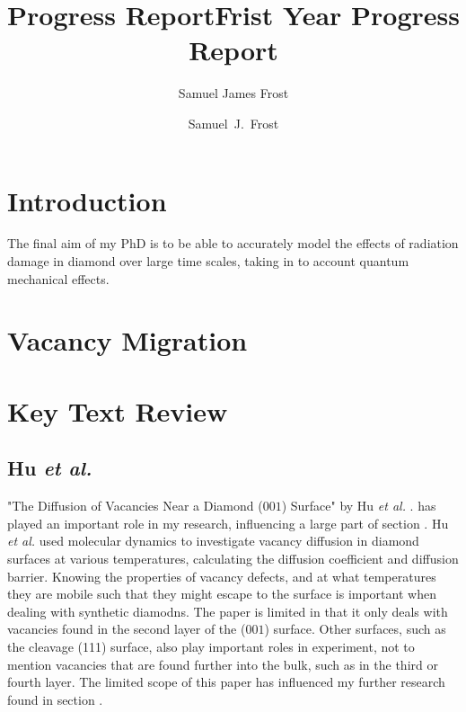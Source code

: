 \documentclass[10pt,a4paper,twocolumn,twoside]{extarticle}
\title{Progress Report}
\author{Samuel James Frost}
\title{Frist Year Progress Report}
\author{Samuel~J.~Frost}
\newcommand{\al}{\emph{et al. }}
\begin{document}
	\thispagestyle{empty}
	\tableofcontents

	
\section{Introduction}
The final aim of my PhD is to be able to accurately model the effects of radiation damage in diamond over large time scales, taking in to account quantum mechanical effects.

\section{Vacancy Migration}



\section{Key Text Review}
\subsection{Hu \al}
\label{Hu}
"The Diffusion of Vacancies Near a Diamond ($001$) Surface" by Hu \al. has played an important role in my research, influencing a large part of section . Hu \al used molecular dynamics to investigate vacancy diffusion in diamond surfaces at various temperatures, calculating the diffusion coefficient and diffusion barrier. Knowing the properties of vacancy defects, and at what temperatures they are mobile such that they might escape to the surface is important when dealing with synthetic diamodns. The paper is limited in that it only deals with vacancies found in the second layer of the ($001$) surface. Other surfaces, such as the cleavage (111) surface, also play important roles in experiment, not to mention vacancies that are found further into the bulk, such as in the third or fourth layer. The limited scope of this paper has influenced my further research found in section .
\end{document}
